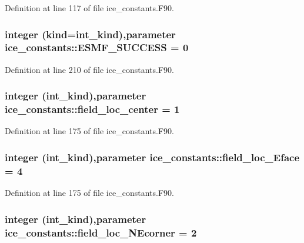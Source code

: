 Definition at line 117 of file ice\_\-constants.F90.\hypertarget{namespaceice__constants_a44cb6638bc9a0baa694a335b146e14f7}{
\subsubsection[{ESMF\_\-SUCCESS}]{\setlength{\rightskip}{0pt plus 5cm}integer (kind=int\_\-kind),parameter {\bf ice\_\-constants::ESMF\_\-SUCCESS} = 0}}
\label{namespaceice__constants_a44cb6638bc9a0baa694a335b146e14f7}


Definition at line 210 of file ice\_\-constants.F90.\hypertarget{namespaceice__constants_a4c526a105da0fa08ad1877e55f6d60fc}{
\subsubsection[{field\_\-loc\_\-center}]{\setlength{\rightskip}{0pt plus 5cm}integer (int\_\-kind),parameter {\bf ice\_\-constants::field\_\-loc\_\-center} = 1}}
\label{namespaceice__constants_a4c526a105da0fa08ad1877e55f6d60fc}


Definition at line 175 of file ice\_\-constants.F90.\hypertarget{namespaceice__constants_a542746cf70d3c18a41d44c5382c4cb34}{
\subsubsection[{field\_\-loc\_\-Eface}]{\setlength{\rightskip}{0pt plus 5cm}integer (int\_\-kind),parameter {\bf ice\_\-constants::field\_\-loc\_\-Eface} = 4}}
\label{namespaceice__constants_a542746cf70d3c18a41d44c5382c4cb34}


Definition at line 175 of file ice\_\-constants.F90.\hypertarget{namespaceice__constants_a6b38e42de787f72eabe064f976338775}{
\subsubsection[{field\_\-loc\_\-NEcorner}]{\setlength{\rightskip}{0pt plus 5cm}integer (int\_\-kind),parameter {\bf ice\_\-constants::field\_\-loc\_\-NEcorner} = 2}}
\label{namespaceice__constants_a6b38e42de787f72eabe064f976338775}


